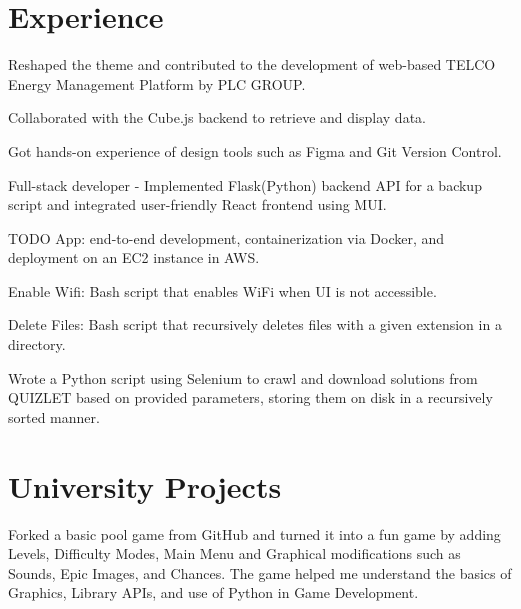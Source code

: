 \documentclass[]{deedy-resume-openfont}
\begin{document}
\begin{minipage}[t]{0.66\textwidth} 


\section{Experience}
\vspace{\topsep} %
\begin{tightemize}
\item Reshaped the theme and contributed to the development of web-based TELCO Energy Management Platform by PLC GROUP.
\item Collaborated with the Cube.js backend to retrieve and display data.
\item Got hands-on experience of design tools such as Figma and Git Version Control. 
\item Full-stack developer - Implemented Flask(Python) backend API for a backup script and integrated user-friendly React frontend using MUI.
\end{tightemize}
\sectionsep
\begin{tightemize}
\item TODO App: end-to-end development, containerization via Docker, and deployment on an EC2 instance in AWS.
\item Enable Wifi: Bash script that enables WiFi when UI is not accessible.
\item Delete Files: Bash script that recursively deletes files with a given extension in a directory.
\item Wrote a Python script using Selenium to crawl and download solutions from QUIZLET based on provided parameters, storing them on disk in a recursively sorted manner.
\end{tightemize}


\section{University Projects}
Forked a basic pool game from GitHub and turned it into a fun game by adding Levels, Difficulty Modes, Main Menu and Graphical modifications such as Sounds, Epic Images, and Chances. The game helped me understand the basics of Graphics, Library APIs, and use of Python in Game Development.  
\sectionsep


\end{minipage}
\end{document}
